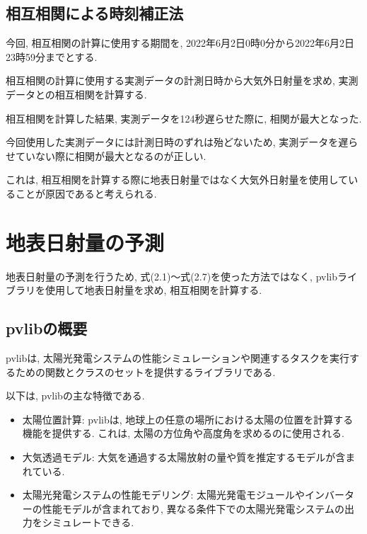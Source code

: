 
\subsection{相互相関による時刻補正法}
今回, 相互相関の計算に使用する期間を, 2022年6月2日0時0分から2022年6月2日23時59分までとする.


相互相関の計算に使用する実測データの計測日時から大気外日射量を求め, 実測データとの相互相関を計算する.

相互相関を計算した結果, 実測データを124秒遅らせた際に, 相関が最大となった.

今回使用した実測データには計測日時のずれは殆どないため, 実測データを遅らせていない際に相関が最大となるのが正しい.

これは, 相互相関を計算する際に地表日射量ではなく大気外日射量を使用していることが原因であると考えられる.

\section{地表日射量の予測}

地表日射量の予測を行うため, 式(2.1)～式(2.7)を使った方法ではなく, pvlibライブラリを使用して地表日射量を求め, 相互相関を計算する.

\subsection{pvlibの概要}
pvlibは, 太陽光発電システムの性能シミュレーションや関連するタスクを実行するための関数とクラスのセットを提供するライブラリである. 

以下は, pvlibの主な特徴である.

\begin{itemize}
  \item 太陽位置計算: pvlibは, 地球上の任意の場所における太陽の位置を計算する機能を提供する. これは, 太陽の方位角や高度角を求めるのに使用される.
  \item 大気透過モデル: 大気を通過する太陽放射の量や質を推定するモデルが含まれている.
  \item 太陽光発電システムの性能モデリング: 太陽光発電モジュールやインバーターの性能モデルが含まれており, 異なる条件下での太陽光発電システムの出力をシミュレートできる.
\end{itemize}

